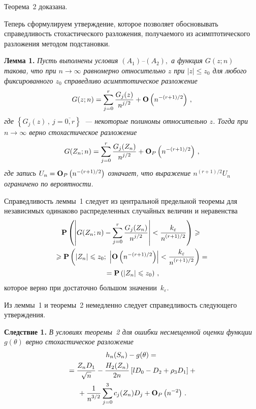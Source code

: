 \begin{multicols}{2}
  Теорема~2 доказана.
\medskip

            Теперь сформулируем утверждение, которое позволяет обосновывать
  справедливость стохастического разложения, получаемого из
  асимптотического разложения методом подстановки.

\medskip


\noindent
{\bf Лемма 1.} {\it Пусть выполнены условия $(A_1)$--$(A_2),$
      а функция $G(z;n)$ такова, что при
      $n\rightarrow\infty$ равномерно относительно $z$ при $|z|\le z_0$
      для любого фиксированного $z_0$ справедливо асимптотическое разложение
  $$  
G(z;n)=\sum_{j=0}^r \displaystyle\frac{\displaystyle G_j(z)\mathstrut}{\displaystyle n^{j/2}\mathstrut}+
      {\bf O}\left(n^{-(r+1)/2}\right)\,,
  $$
 где $\left\{G_j(z)\,,\ j=\overline{0,r} \right\} $~--- некоторые
      полиномы относительно $z$. Тогда при
      $n\rightarrow\infty$ верно стохастическое разложение
  $$  
G(Z_n;n)=\sum_{j=0}^r \displaystyle\frac{\displaystyle G_j(Z_n)\mathstrut}{\displaystyle n^{j/2}\mathstrut}+
      {\bf O}_P\left(n^{-(r+1)/2}\right)\,,
  $$
где запись $U_n={\bf O}_P\left(n^{-(r+1)/2}\right)$ означает,
что выражение $n^{(r+1)/2}U_n$ ограничено по вероятности.
}

\medskip
Справедливость леммы~1 следует из центральной предельной
   теоремы для независимых одинаково распределенных случайных
   величин и неравенства
  \begin{multline*}
  {\bf P}\left(
       \left| G(Z_n;n)-\sum_{j=0}^r \displaystyle\frac{\displaystyle G_j(Z_n)\mathstrut}{\displaystyle n^{j/2}\mathstrut}\right|
       <\displaystyle\frac{\displaystyle k_\varepsilon\mathstrut}{\displaystyle n^{(r+1)/2}\mathstrut} \right)\geqslant
  {}\\
{}   \geqslant {\bf P} \left(\left|Z_n\right|\leqslant z_0;~
        \left|{\bf O}\left(n^{-(r+1)/2}\right) \right|<
        \displaystyle\frac{\displaystyle k_\varepsilon\mathstrut}{\displaystyle n^{(r+1)/2}\mathstrut} \right)={}\\
        {}=
        {\bf P} \left(\left|Z_n\right|\leqslant z_0\right)\,,
\end{multline*}
  которое верно при достаточно большом значении~$k_\varepsilon$.

  Из леммы~1 и теоремы~2 немедленно следует справедливость
  следующего утверждения.

\medskip

\noindent
{\bf Следствие 1.} {\it В условиях теоремы~2 для ошибки
  несмещенной оценки функции $g(\theta)$ верно стохастическое разложение
\begin{multline*} 
h_n(S_n)-g(\theta)={}\\
{}=\displaystyle\frac{\displaystyle Z_nD_1\mathstrut}{\displaystyle \sqrt{n}\mathstrut}-
     \displaystyle\frac{\displaystyle H_2(Z_n)\mathstrut}{\displaystyle 2n\mathstrut}\left[lD_0-D_2+\rho_3D_1\right]+{}\\
{}+
     \displaystyle\frac{\displaystyle 1\mathstrut}{\displaystyle n^{3/2}\mathstrut} \sum_{j=0}^3 c_j(Z_n)D_j+
     {\bf O}_P\left(n^{-2}\right)\,.
\end{multline*}
   }


\end{multicols}
